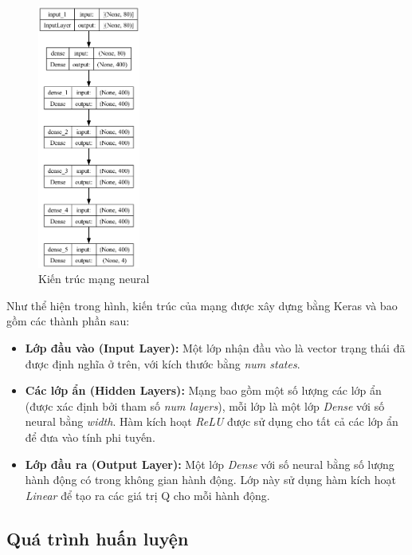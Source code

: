 \begin{figure}[!htp]
    \centering
    \includegraphics[width=0.3\textwidth]{img/model_structure}
    \caption{Kiến trúc mạng neural}
    \label{fig:model_structure}
\end{figure}

Như thể hiện trong hình, kiến trúc của mạng được xây dựng bằng Keras và bao gồm các thành phần sau:

\begin{itemize}
    \item \textbf{Lớp đầu vào (Input Layer):} Một lớp nhận đầu vào là vector trạng thái đã được định nghĩa ở trên, với kích thước bằng \textit{num states}.

    \item \textbf{Các lớp ẩn (Hidden Layers):} Mạng bao gồm một số lượng các lớp ẩn (được xác định bởi tham số \textit{num layers}), mỗi lớp là một lớp \textit{Dense} với số neural bằng \textit{width}. Hàm kích hoạt \textit{ReLU} được sử dụng cho tất cả các lớp ẩn để đưa vào tính phi tuyến.

    \item \textbf{Lớp đầu ra (Output Layer):} Một lớp \textit{Dense} với số neural bằng số lượng hành động có trong không gian hành động. Lớp này sử dụng hàm kích hoạt \textit{Linear} để tạo ra các giá trị Q cho mỗi hành động.
\end{itemize}

\subsection{Quá trình huấn luyện}
